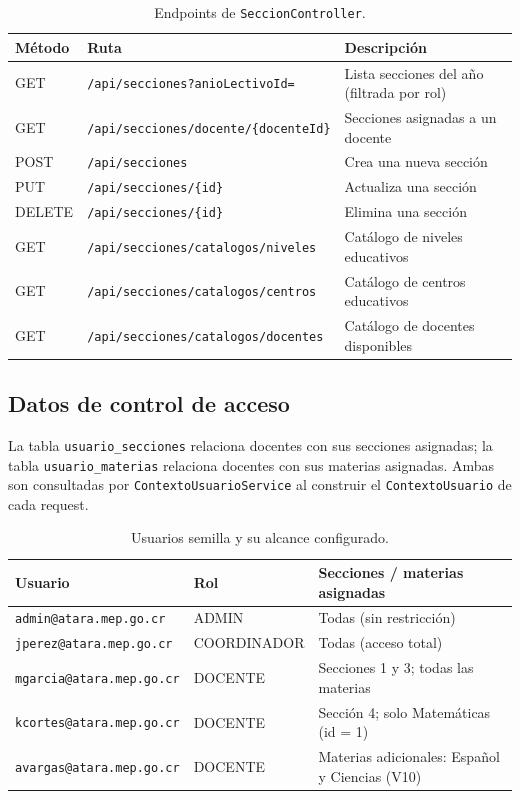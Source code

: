 \documentclass[11pt,a4paper,oneside]{article}
\newcommand{\code}[1]{\texttt{\small #1}}
\begin{document}
\begin{table}[h]
\centering\renewcommand{\arraystretch}{1.15}\small
\begin{tabular}{@{}p{1.6cm} p{6.5cm} p{5.5cm}@{}}
\toprule
\textbf{Método} & \textbf{Ruta} & \textbf{Descripción} \\
\midrule
GET    & \code{/api/secciones?anioLectivoId=}             & Lista secciones del año (filtrada por rol) \\
GET    & \code{/api/secciones/docente/\{docenteId\}}      & Secciones asignadas a un docente \\
POST   & \code{/api/secciones}                            & Crea una nueva sección \\
PUT    & \code{/api/secciones/\{id\}}                     & Actualiza una sección \\
DELETE & \code{/api/secciones/\{id\}}                     & Elimina una sección \\
GET    & \code{/api/secciones/catalogos/niveles}          & Catálogo de niveles educativos \\
GET    & \code{/api/secciones/catalogos/centros}          & Catálogo de centros educativos \\
GET    & \code{/api/secciones/catalogos/docentes}         & Catálogo de docentes disponibles \\
\bottomrule
\end{tabular}
\caption{Endpoints de \code{SeccionController}.}
\end{table}

\subsection{Datos de control de acceso}

La tabla \code{usuario\_secciones} relaciona docentes con sus secciones asignadas; la tabla
\code{usuario\_materias} relaciona docentes con sus materias asignadas. Ambas son consultadas
por \code{ContextoUsuarioService} al construir el \code{ContextoUsuario} de cada request.

\begin{table}[h]
\centering\renewcommand{\arraystretch}{1.15}\small
\begin{tabular}{@{}p{4.7cm} p{2.8cm} p{6.0cm}@{}}
\toprule
\textbf{Usuario} & \textbf{Rol} & \textbf{Secciones / materias asignadas} \\
\midrule
\code{admin@atara.mep.go.cr}     & ADMIN        & Todas (sin restricción) \\
\code{jperez@atara.mep.go.cr}    & COORDINADOR  & Todas (acceso total) \\
\code{mgarcia@atara.mep.go.cr}   & DOCENTE      & Secciones 1 y 3; todas las materias \\
\code{kcortes@atara.mep.go.cr}   & DOCENTE      & Sección 4; solo Matemáticas (id = 1) \\
\code{avargas@atara.mep.go.cr}   & DOCENTE      & Materias adicionales: Español y Ciencias (V10) \\
\bottomrule
\end{tabular}
\caption{Usuarios semilla y su alcance configurado.}
\end{table}
\end{document}
